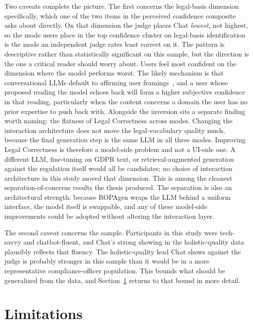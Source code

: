 Two caveats complete the picture. The first concerns the
legal-basis dimension specifically, which one of the two items
in the perceived confidence composite asks about directly. On
that dimension the judge places Chat \emph{lowest}, not highest,
so the mode users place in the top confidence cluster on
legal-basis identification is the mode an independent judge rates
least correct on it. The pattern is descriptive rather
than statistically significant on this sample, but the direction
is the one a critical reader should worry about.
Users feel most confident on the dimension where the model performs worst.
The likely mechanism is that conversational
LLMs default to affirming user
framings~\cite{sharmaTowardsUnderstandingSycophancy2023}, and a
user whose proposed reading the model echoes back will form a
higher subjective confidence in that reading, particularly when
the content concerns a domain the user has no prior expertise
to push back with. Alongside the inversion sits a separate finding
worth naming: the flatness of Legal Correctness across modes.
Changing the interaction architecture does not move the
legal-vocabulary quality much, because the final generation step
is the same LLM in all three modes. Improving Legal Correctness
is therefore a model-side problem and not a UI-side one. A
different LLM, fine-tuning on GDPR text, or retrieval-augmented
generation against the regulation itself would all be candidates;
no choice of interaction architecture in this study moved that
dimension. This is among the cleanest separation-of-concerns
results the thesis produced. The separation is also an
architectural strength: because ROPAgen wraps the LLM behind
a uniform interface, the model itself is swappable, and any
of these model-side improvements could be adopted without
altering the interaction layer.

The second caveat concerns the sample. Participants in this
study were tech-savvy and chatbot-fluent, and Chat's strong
showing in the holistic-quality data plausibly reflects that
fluency. The holistic-quality lead Chat shows
against the judge is probably stronger in this sample than it
would be in a more representative compliance-officer population. This bounds what should be
generalized from the data, and Section~\ref{sec:disc-limits}
returns to that bound in more detail.


\bigskip
\bigskip
\bigskip

\section{Limitations}
\label{sec:disc-limits}

